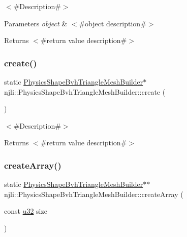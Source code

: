 $<$\#\+Description\#$>$


\begin{DoxyParams}{Parameters}
{\em object} & $<$\#object description\#$>$\\
\hline
\end{DoxyParams}
\begin{DoxyReturn}{Returns}
$<$\#return value description\#$>$ 
\end{DoxyReturn}
\mbox{\label{classnjli_1_1_physics_shape_bvh_triangle_mesh_builder_ae65c5a0d924be1661f201f35eedbe1cf}} 
\subsubsection{\texorpdfstring{create()}{create()}}
{\footnotesize\ttfamily static \mbox{\hyperlink{classnjli_1_1_physics_shape_bvh_triangle_mesh_builder}{Physics\+Shape\+Bvh\+Triangle\+Mesh\+Builder}}$\ast$ njli\+::\+Physics\+Shape\+Bvh\+Triangle\+Mesh\+Builder\+::create (\begin{DoxyParamCaption}{ }\end{DoxyParamCaption})\hspace{0.3cm}{\ttfamily [static]}}

$<$\#\+Description\#$>$

\begin{DoxyReturn}{Returns}
$<$\#return value description\#$>$ 
\end{DoxyReturn}
\mbox{\label{classnjli_1_1_physics_shape_bvh_triangle_mesh_builder_a7ad3378b3bb9dd8a11f510bd37cc38ac}} 
\subsubsection{\texorpdfstring{create\+Array()}{createArray()}}
{\footnotesize\ttfamily static \mbox{\hyperlink{classnjli_1_1_physics_shape_bvh_triangle_mesh_builder}{Physics\+Shape\+Bvh\+Triangle\+Mesh\+Builder}}$\ast$$\ast$ njli\+::\+Physics\+Shape\+Bvh\+Triangle\+Mesh\+Builder\+::create\+Array (\begin{DoxyParamCaption}\item[{const \mbox{\hyperlink{_util_8h_a10e94b422ef0c20dcdec20d31a1f5049}{u32}}}]{size }\end{DoxyParamCaption})\hspace{0.3cm}{\ttfamily [static]}}

